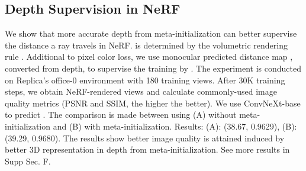 \subsection{Depth Supervision in NeRF}
\label{experiments:nerf}
\vspace{-2pt}
We show that more accurate depth from meta-initialization can better supervise the distance  a ray travels in NeRF.  is determined by the volumetric rendering rule \cite{deng2022depth}. Additional to pixel color loss, we use monocular predicted distance map , converted from depth, to supervise the training by . The experiment is conducted on Replica's office-0 environment with 180 training views. After 30K training steps, we obtain NeRF-rendered views and calculate commonly-used image quality metrics (PSNR and SSIM, the higher the better). We use ConvNeXt-base to predict . The comparison is made between using (A) without meta-initialization and (B) with meta-initialization.
Results: (A): (38.67, 0.9629), (B): (39.29, 0.9680). The results show better image quality is attained induced by better 3D representation in depth from meta-initialization. 
See more results in Supp Sec. F.






















%
